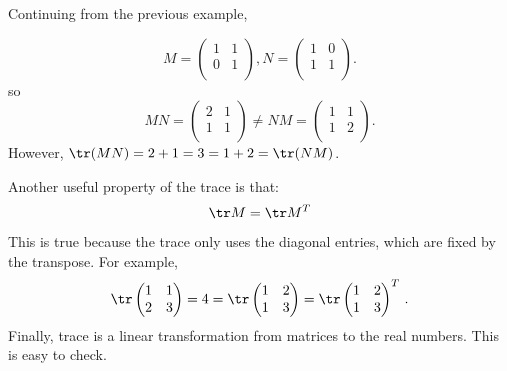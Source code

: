 \begin{example}
Continuing from the previous example, 

\[
M= \begin{pmatrix}
1 & 1 \\
0 & 1 \\
\end{pmatrix}, N=
\begin{pmatrix}
1 & 0 \\
1 & 1 \\
\end{pmatrix}.
\]
so
\[
MN = \begin{pmatrix}
2 & 1 \\
1 & 1 \\
\end{pmatrix} \neq
NM = \begin{pmatrix}
1 & 1 \\
1 & 2 \\
\end{pmatrix}.
\]
However, $\tr(MN) = 2+1 = 3 = 1+2 = \tr(NM)$.
\end{example}

Another useful property of the trace is that:
\[\tr M = \tr M^T\] 
This is true because the trace only uses the diagonal entries, which are fixed by the transpose.  For example, 
$$\tr \begin{pmatrix}
1 & 1 \\
2 & 3 \\
\end{pmatrix} = 4 = \tr \begin{pmatrix}
1 & 2 \\
1 & 3 \\
\end{pmatrix} = \tr \begin{pmatrix}
1 & 2 \\
1 & 3 \\
\end{pmatrix}^T\, .
$$
Finally, trace is a linear transformation from matrices to the real numbers.  This is easy to check.


